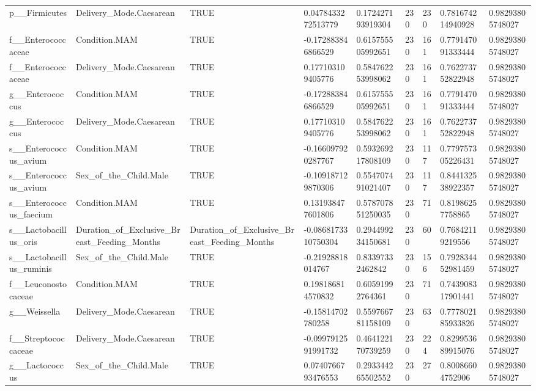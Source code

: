 \begin{longtable}{lllllllll}
p\_\_Firmicutes & Delivery\_Mode.Caesarean & TRUE & 0.0478433272513779 & 0.172427193919304 & 230 & 230 & 0.781674214940928 & 0.98293805748027 \\
f\_\_Enterococcaceae & Condition.MAM & TRUE & -0.172883846866529 & 0.615755505992651 & 230 & 161 & 0.779147091333444 & 0.98293805748027 \\
f\_\_Enterococcaceae & Delivery\_Mode.Caesarean & TRUE & 0.177103109405776 & 0.584762253998062 & 230 & 161 & 0.762273752822948 & 0.98293805748027 \\
g\_\_Enterococcus & Condition.MAM & TRUE & -0.172883846866529 & 0.615755505992651 & 230 & 161 & 0.779147091333444 & 0.98293805748027 \\
g\_\_Enterococcus & Delivery\_Mode.Caesarean & TRUE & 0.177103109405776 & 0.584762253998062 & 230 & 161 & 0.762273752822948 & 0.98293805748027 \\
s\_\_Enterococcus\_avium & Condition.MAM & TRUE & -0.166097920287767 & 0.593269217808109 & 230 & 117 & 0.779757305226431 & 0.98293805748027 \\
s\_\_Enterococcus\_avium & Sex\_of\_the\_Child.Male & TRUE & -0.109187129870306 & 0.554707491021407 & 230 & 117 & 0.844132538922357 & 0.98293805748027 \\
s\_\_Enterococcus\_faecium & Condition.MAM & TRUE & 0.131938477601806 & 0.578707851250035 & 230 & 71 & 0.81986257758865 & 0.98293805748027 \\
s\_\_Lactobacillus\_oris & Duration\_of\_Exclusive\_Breast\_Feeding\_Months & Duration\_of\_Exclusive\_Breast\_Feeding\_Months & -0.0868173310750304 & 0.294499234150681 & 230 & 60 & 0.76842119219556 & 0.98293805748027 \\
s\_\_Lactobacillus\_ruminis & Sex\_of\_the\_Child.Male & TRUE & -0.21928818014767 & 0.83397332462842 & 230 & 156 & 0.792834452981459 & 0.98293805748027 \\
f\_\_Leuconostocaceae & Condition.MAM & TRUE & 0.198186814570832 & 0.60591992764361 & 230 & 71 & 0.743908317901441 & 0.98293805748027 \\
g\_\_Weissella & Delivery\_Mode.Caesarean & TRUE & -0.15814702780258 & 0.559766781158109 & 230 & 63 & 0.777802185933826 & 0.98293805748027 \\
f\_\_Streptococcaceae & Delivery\_Mode.Caesarean & TRUE & -0.0997912591991732 & 0.464122170739259 & 230 & 224 & 0.829953689915076 & 0.98293805748027 \\
g\_\_Lactococcus & Sex\_of\_the\_Child.Male & TRUE & 0.0740766793476553 & 0.293344265502552 & 230 & 27 & 0.80086604752906 & 0.98293805748027 \\

\end{longtable}
